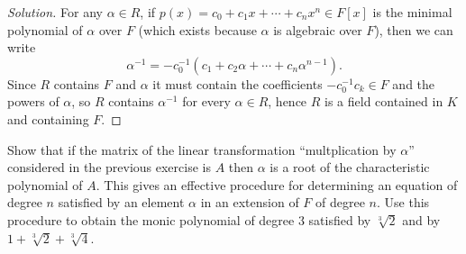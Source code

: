 \documentclass[10pt]{article}
\providecommand{\inv}{^{-1}}
\newenvironment{soln}{\begin{proof}[Solution]}{\end{proof}}
\begin{document}
\begin{soln}
    For any $\alpha\in R$,
    if $p(x) = c_0 + c_1x + \cdots + c_nx^n \in F[x]$
    is the minimal polynomial of $\alpha$ over $F$
    (which exists because $\alpha$ is algebraic over $F$),
    then we can write
    \begin{equation*}
	\alpha\inv = -c_0\inv(c_1 + c_2\alpha + \cdots + c_n\alpha^{n-1}).
    \end{equation*}
    Since $R$ contains $F$ and $\alpha$ it must contain
    the coefficients $-c_0\inv c_k\in F$
    and the powers of $\alpha$, so $R$ contains $\alpha\inv$
    for every $\alpha\in R$, hence $R$ is a field
    contained in $K$ and containing $F$.
\end{soln}

\begin{problem}
    [\S13.2\#20]
    Show that if the matrix of the linear transformation
    ``multplication by $\alpha$'' considered in the previous exercise
    is $A$ then $\alpha$ is a root of the characteristic polynomial of $A$.
    This gives an effective procedure for determining
    an equation of degree $n$ satisfied by an element $\alpha$
    in an extension of $F$ of degree $n$.
    Use this procedure to obtain the monic polynomial
    of degree $3$ satisfied by $\sqrt[3]2$
    and by $1+\sqrt[3]2 + \sqrt[3]4$.
\end{problem}
\end{document}
